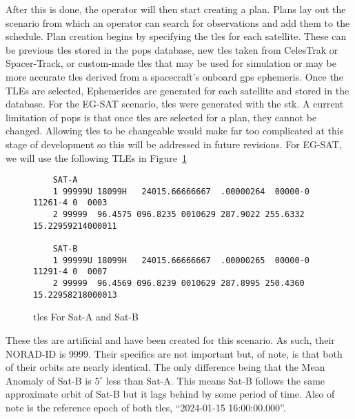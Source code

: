 After this is done, the operator will then start creating a plan. Plans lay out
the scenario from which an operator can search for observations and add
them to the schedule. Plan creation begins by specifying the
\glspl{tle} for each satellite.  These can be previous \glspl{tle} stored in
the \gls{pops} database, new \glspl{tle} taken from CelesTrak or Spacer-Track,
or custom-made \glspl{tle} that may be used for simulation or may be more
accurate \glspl{tle} derived from a spacecraft’s onboard \gls{gps} ephemeris.
Once the TLEs are selected, Ephemerides are generated for each satellite and
stored in the database. For the EG-SAT scenario, \glspl{tle} were generated
with the \gls{stk}. A current limitation of \gls{pops} is that once \glspl{tle}
are selected for a plan, they cannot be changed. Allowing \glspl{tle} to be
changeable would make far too complicated at this stage of development so this
will be addressed in future revisions. For EG-SAT, we will use the following
TLEs in Figure~\ref{fig:tles} 

\begin{figure}[h]
    \begin{verbatim}
    SAT-A
    1 99999U 18099H   24015.66666667  .00000264  00000-0  11261-4 0  0003
    2 99999  96.4575 096.8235 0010629 287.9022 255.6332 15.22959214000011

    SAT-B
    1 99999U 18099H   24015.66666667  .00000265  00000-0  11291-4 0  0007
    2 99999  96.4569 096.8239 0010629 287.8995 250.4360 15.22958218000013
    \end{verbatim}
    \caption{\glspl{tle} For Sat-A and Sat-B}
    \label{fig:tles}
\end{figure}

These \glspl{tle} are artificial and have been created for this scenario. As
such, their NORAD-ID is 9999. Their specifics are not important but, of note,
is that both of their orbits are nearly identical. The only difference being
that the Mean Anomaly of Sat-B is $5^\circ$ less than Sat-A. This means Sat-B
follows the same approximate orbit of Sat-B but it lags behind by some period
of time. Also of note is the reference epoch of both \glspl{tle}, ``2024-01-15
16:00:00.000''.

